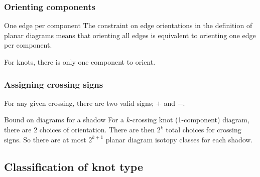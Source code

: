 \documentclass[presentation]{beamer}
\begin{document}
\begin{frame}
  \frametitle{Orienting components}
  \begin{block}{One edge per component}
    The constraint on edge orientations in the definition of planar
    diagrams means that orienting all edges is equivalent to orienting
    one edge per component.
  \end{block}

  For knots, there is only one component to orient.
\end{frame}

\begin{frame}
  \frametitle{Assigning crossing signs}
  For any given crossing, there are two valid signs; $+$ and $-$.

  \begin{block}{Bound on diagrams for a shadow}
    For a $k$-crossing knot (1-component) diagram, there are 2 choices
    of orientation. There are then $2^k$ total choices for crossing
    signs. So there are at most $2^{k+1}$ planar diagram isotopy
    classes for each shadow.
  \end{block}
\end{frame}

\subsection{Classification of knot type}
\end{document}
